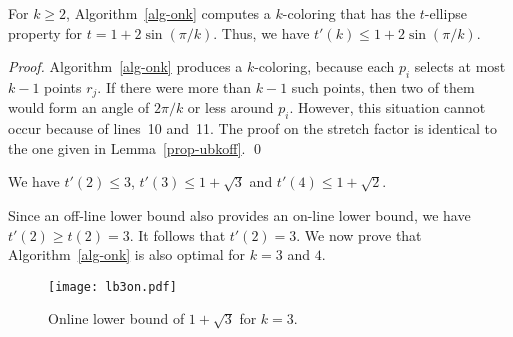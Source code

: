 \documentclass[pdftex,leqno,fleqn,12pts]{llncs}
\begin{document}
\begin{lemma} \label{prop-ubkon}
For $k\geq 2$, Algorithm~\ref{alg-onk} computes a $k$-coloring that has 
the $t$-ellipse property for $t=1+2\sin(\pi/k)$.
Thus, we have $t'(k) \leq 1+2\sin(\pi/k)$.
\end{lemma}
\begin{proof}
Algorithm~\ref{alg-onk} produces a $k$-coloring, because each $p_i$
selects at most $k-1$ points $r_j$. If there were more than $k-1$
such points, then two of them would form an angle of $2\pi/k$ or
less around $p_i$. However, this situation cannot occur because of
lines~10 and~11. The proof on the stretch factor is 
identical to the one given in
Lemma~\ref{prop-ubkoff}.
\qed 
\end{proof}

\begin{corollary} 
We have $t'(2) \leq 3$, $t'(3) \leq 1+\sqrt{3}$ and 
$t'(4) \leq 1+\sqrt{2}$.  
\end{corollary}

Since an off-line lower bound also provides an on-line lower bound,
we have $t'(2) \geq t(2) = 3$. It follows that $t'(2)=3$. 
We now prove that Algorithm~\ref{alg-onk} is also optimal for $k=3$ and
$4$.

\begin{figure}
\centering\texttt{[image: lb3on.pdf]}\caption{Online lower bound of
$1+\sqrt{3}$ for $k=3$.}\label{fig-lb3on}
\end{figure}
\end{document}
